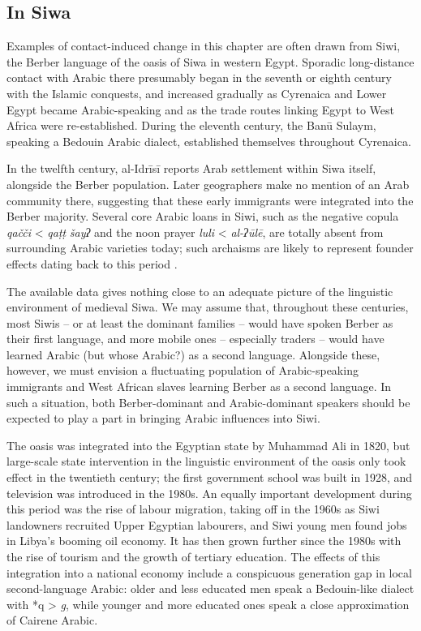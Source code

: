 \documentclass[output=paper]{langsci/langscibook}
\begin{document}
 
 \subsection{In Siwa}


Examples of contact-induced change in this chapter are often drawn from Siwi, the Berber language of the oasis of Siwa in western Egypt. Sporadic long-distance contact with Arabic there presumably began in the seventh or eighth century with the Islamic conquests, and increased gradually as Cyrenaica and Lower Egypt became Arabic-speaking and as the trade routes linking Egypt to West Africa were re-established.  During the eleventh century, the Banū Sulaym, speaking a Bedouin Arabic dialect, established themselves throughout Cyrenaica.

In the twelfth century, al-Idrīsī reports Arab settlement within Siwa itself, alongside the Berber population. Later geographers make no mention of an Arab community there, suggesting that these early immigrants were integrated into the Berber majority. Several core Arabic loans in Siwi, such as the negative copula \textit{qačči} < \textit{qaṭṭ} \textit{šayʔ} and the noon prayer \textit{luli} < \textit{al-ʔūlē}, are totally absent from surrounding Arabic varieties today; such archaisms are likely to represent founder effects dating back to this period \citep{Souag2009}.  

The available data gives nothing close to an adequate picture of the linguistic environment of medieval Siwa. We may assume that, throughout these centuries, most Siwis – or at least the dominant families – would have spoken Berber as their first language, and more mobile ones – especially traders – would have learned Arabic (but whose Arabic?) as a second language. Alongside these, however, we must envision a fluctuating population of Arabic-speaking immigrants and West African slaves learning Berber as a second language. In such a situation, both Berber-dominant and Arabic-dominant speakers should be expected to play a part in bringing Arabic influences into Siwi.

The oasis was integrated into the Egyptian state by Muhammad Ali in 1820, but large-scale state intervention in the linguistic environment of the oasis only took effect in the twentieth century; the first government school was built in 1928, and television was introduced in the 1980s. An equally important development during this period was the rise of labour migration, taking off in the 1960s as Siwi landowners recruited Upper Egyptian labourers, and Siwi young men found jobs in Libya's booming oil economy. It has then grown further since the 1980s with the rise of tourism and the growth of tertiary education. The effects of this integration into a national economy include a conspicuous generation gap in local second-language Arabic: older and less educated men speak a Bedouin-like dialect with *q > \textit{g}, while younger and more educated ones speak a close approximation of Cairene Arabic.
\end{document}
